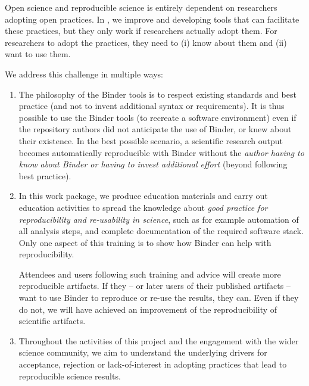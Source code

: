 \begin{workpackage}[id=education,wphases=0-36!1.14,
  title={Dissemination, education and engagement},
  short=Education,
  lead=IFR,
  IFRRM=16,
  MPRM=6,
  SRLRM=7,
  QSRM=3,
  UIORM=9,
  swsites
]

\begin{wpdescription}

  Open science and reproducible science is entirely dependent on researchers
  adopting open practices. In \TheProject, we improve and developing tools that
  can facilitate these practices, but they only work if researchers actually adopt
  them. For researchers to adopt the practices, they need to (i) know about them
  and (ii) want to use them.

  We address this challenge in multiple ways:
  \begin{enumerate}
  \item The philosophy of the Binder tools is to respect existing standards and
    best practice (and not to invent additional syntax or requirements). It is
    thus possible to use the Binder tools (to recreate a software environment)
    even if the repository authors did not anticipate the use of Binder, or knew
    about their existence. In the best possible scenario, a scientific research
    output becomes automatically reproducible with Binder without the
    \emph{author having to know about Binder or having to invest additional
      effort} (beyond following best practice).

    \item In this work package, we produce education materials and carry out
      education activities to spread the knowledge about \emph{good practice for
        reproducibility and re-usability in science}, such as for example
      automation of all analysis steps, and complete documentation of the
      required software stack. Only one aspect of this training is to show how
      Binder can help with reproducibility.

      Attendees and users following such training and advice will create more
      reproducible artifacts. If they -- or later users of their published
      artifacts -- want to use Binder to reproduce or re-use the results, they
      can. Even if they do not, we will have achieved an improvement of the
      reproducibility of scientific artifacts.

    \item Throughout the activities of this project and the engagement with the
      wider science community, we aim to understand the underlying drivers for
      acceptance, rejection or lack-of-interest in adopting practices that lead
      to reproducible science results.
  \end{enumerate}


\end{wpdescription}
\end{workpackage}
